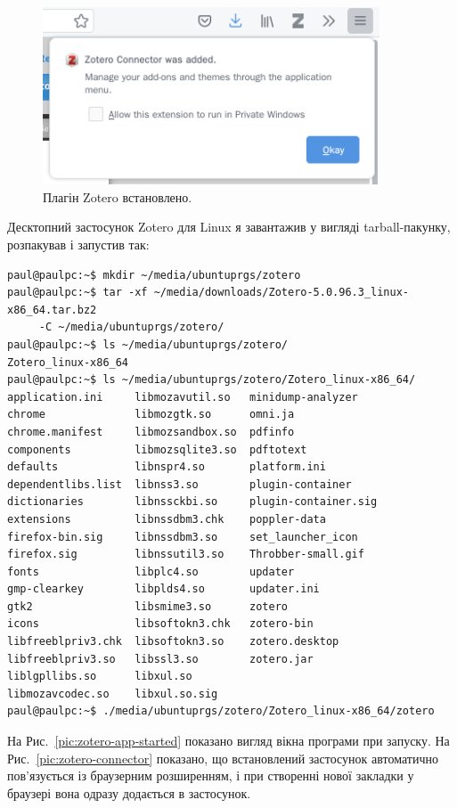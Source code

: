 \documentclass[oneside,14pt,a4paper]{extreport}
\begin{document}
\begin{figure}[H]
    \centering
    \includegraphics[width=10cm]{imgs/sp2_zotero_plugin_added.png}
    \caption{Плагін Zotero встановлено.}
    \label{pic:zotero-plugin-added}
\end{figure}

Десктопний застосунок Zotero для Linux я завантажив  у вигляді tarball-пакунку, розпакував і запустив так:

\small\begin{verbatim}
paul@paulpc:~$ mkdir ~/media/ubuntuprgs/zotero
paul@paulpc:~$ tar -xf ~/media/downloads/Zotero-5.0.96.3_linux-x86_64.tar.bz2
     -C ~/media/ubuntuprgs/zotero/
paul@paulpc:~$ ls ~/media/ubuntuprgs/zotero/
Zotero_linux-x86_64
paul@paulpc:~$ ls ~/media/ubuntuprgs/zotero/Zotero_linux-x86_64/
application.ini     libmozavutil.so   minidump-analyzer
chrome              libmozgtk.so      omni.ja
chrome.manifest     libmozsandbox.so  pdfinfo
components          libmozsqlite3.so  pdftotext
defaults            libnspr4.so       platform.ini
dependentlibs.list  libnss3.so        plugin-container
dictionaries        libnssckbi.so     plugin-container.sig
extensions          libnssdbm3.chk    poppler-data
firefox-bin.sig     libnssdbm3.so     set_launcher_icon
firefox.sig         libnssutil3.so    Throbber-small.gif
fonts               libplc4.so        updater
gmp-clearkey        libplds4.so       updater.ini
gtk2                libsmime3.so      zotero
icons               libsoftokn3.chk   zotero-bin
libfreeblpriv3.chk  libsoftokn3.so    zotero.desktop
libfreeblpriv3.so   libssl3.so        zotero.jar
liblgpllibs.so      libxul.so
libmozavcodec.so    libxul.so.sig
paul@paulpc:~$ ./media/ubuntuprgs/zotero/Zotero_linux-x86_64/zotero
\end{verbatim}\normalsize

На Рис.~\ref{pic:zotero-app-started} показано вигляд вікна програми при запуску. На Рис.~\ref{pic:zotero-connector} показано, що встановлений застосунок автоматично пов'язується із браузерним розширенням, і при створенні нової закладки у браузері вона одразу додається в застосунок.
\end{document}
